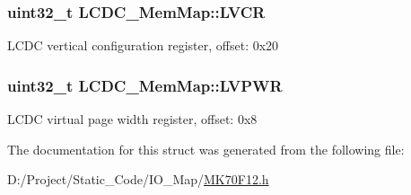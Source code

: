 \subsubsection[{L\+V\+C\+R}]{\setlength{\rightskip}{0pt plus 5cm}uint32\+\_\+t L\+C\+D\+C\+\_\+\+Mem\+Map\+::\+L\+V\+C\+R}\label{struct_l_c_d_c___mem_map_a865c74a990435ca94ba226f23894d8e7}
L\+C\+D\+C vertical configuration register, offset\+: 0x20 \hypertarget{struct_l_c_d_c___mem_map_aa687c8b47cdcef18890cac689de49a17}{}
\subsubsection[{L\+V\+P\+W\+R}]{\setlength{\rightskip}{0pt plus 5cm}uint32\+\_\+t L\+C\+D\+C\+\_\+\+Mem\+Map\+::\+L\+V\+P\+W\+R}\label{struct_l_c_d_c___mem_map_aa687c8b47cdcef18890cac689de49a17}
L\+C\+D\+C virtual page width register, offset\+: 0x8 

The documentation for this struct was generated from the following file\+:\begin{DoxyCompactItemize}
\item 
D\+:/\+Project/\+Static\+\_\+\+Code/\+I\+O\+\_\+\+Map/\hyperlink{_m_k70_f12_8h}{M\+K70\+F12.\+h}\end{DoxyCompactItemize}
